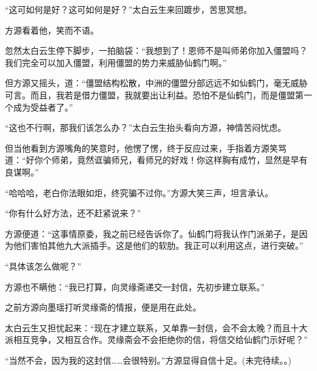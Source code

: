 \begin{this_body}
“这可如何是好？这可如何是好？”太白云生来回踱步，苦思冥想。

方源看着他，笑而不语。

忽然太白云生停下脚步，一拍脑袋：“我想到了！恩师不是叫师弟你加入僵盟吗？我们完全可以加入僵盟，利用僵盟的势力来威胁仙鹤门啊。”

但方源又摇头，道：“僵盟结构松散，中洲的僵盟分部远远不如仙鹤门，毫无威胁可言。而且，我若是借力僵盟，我就要出让利益。恐怕不是仙鹤门，而是僵盟第一个成为受益者了。”

“这也不行啊，那我们该怎么办？”太白云生抬头看向方源，神情苦闷忧虑。

但当他看到方源嘴角的笑意时，他愣了愣，终于反应过来，手指着方源笑骂道：“好你个师弟，竟然诓骗师兄，看师兄的好戏！你这样胸有成竹，显然是早有良谋啊。”

“哈哈哈，老白你法眼如炬，终究骗不过你。”方源大笑三声，坦言承认。

“你有什么好方法，还不赶紧说来？”

方源便道：“这事情原委，我之前已经告诉你了。仙鹤门将我认作门派弟子，是因为他们害怕其他九大派插手。这是他们的软肋。我正可以利用这点，进行突破。”

“具体该怎么做呢？”

方源也不瞒他：“我已打算，向灵缘斋递交一封信，先初步建立联系。”

之前方源向墨瑶打听灵缘斋的情报，便是用在此处。

太白云生又担忧起来：“现在才建立联系，又单靠一封信，会不会太晚？而且十大派相互竞争，又相互合作。灵缘斋会不会拒绝你的信，将信交给仙鹤门示好呢？”

“当然不会，因为我的这封信……会很特别。”方源显得自信十足。(未完待续。。)

\end{this_body}

